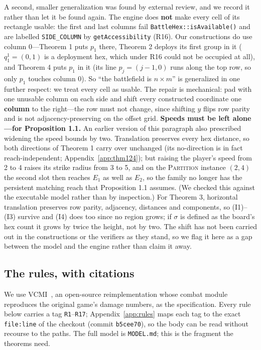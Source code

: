 \documentclass[11pt,a4paper]{article}
\theoremstyle{plain}
\theoremstyle{definition}
\theoremstyle{plain}
\theoremstyle{definition}
\theoremstyle{remark}
\newcommand{\PARTITION}{\textsc{Partition}}
\newcommand{\src}[1]{\texttt{#1}}
\begin{document}
A second, smaller generalization was found by external review, and we record it rather than
let it be found again. The engine does \textbf{not} make every cell of its rectangle usable: the first and
last columns fail \src{BattleHex::isAvailable()} and are labelled \src{SIDE\_COLUMN} by
\src{getAccessibility} (R16). Our constructions do use column 0---Theorem 1 puts $p_1$ there,
Theorem 2 deploys its first group in it ($q_1^1=(0,1)$ is a deployment hex, which under R16
could not be occupied at all), and Theorem 4 puts $p_1$ in it (its line
$p_j = (j-1, 0)$ runs along the top row, so only $p_1$ touches column 0). So ``the battlefield is
$n\times m$'' is generalized in one further respect: we treat every cell as usable. The repair is
mechanical: pad with one unusable column on each side and shift every constructed coordinate
one \textbf{column} to the right---the row must not change, since shifting $y$ flips row parity
and is not adjacency-preserving on the offset grid.
\textbf{Speeds must be left alone---for Proposition 1.1.} An earlier version of this
paragraph also prescribed widening the speed bounds by two. Translation preserves every hex
distance, so both directions of Theorem 1 carry over unchanged (its no-direction is in fact
reach-independent; Appendix~\ref{app:thm124}); but raising the player's speed from 2 to 4
raises its strike radius from 3 to 5, and on the \PARTITION{} instance $(2,4)$ the second
slot then reaches $E_1$ as well as $E_2$, so the family no longer has the persistent matching
reach that Proposition 1.1 assumes. (We checked this against the executable model rather than
by inspection.) For Theorem 3, horizontal translation preserves row parity, adjacency, distances and
components, so (I1)--(I3) survive and (I4) does too since no region grows; if $\sigma$ is defined
as the board's hex count it grows by twice the height, not by two. The shift has not been carried
out in the constructions or the verifiers as they stand, so we flag it here as a gap between the
model and the engine rather than claim it away.

\subsection{The rules, with citations}\label{sec:rules}

We use VCMI~\cite{VCMI26}, an open-source reimplementation whose combat module reproduces the original
game's damage numbers, as the specification. Every rule below carries a tag \texttt{R1}--\texttt{R17};
Appendix~\ref{app:rules} maps each tag to the exact \src{file:line} of the checkout (commit
\src{b5cee70}), so the body can be read without recourse to the paths. The full model is
\src{MODEL.md}; this is the fragment the theorems need.
\end{document}

